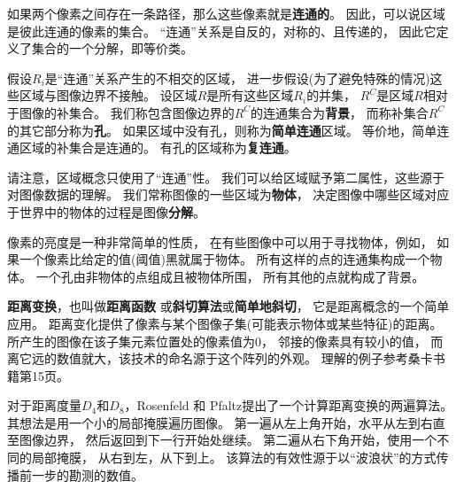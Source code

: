 如果两个像素之间存在一条路径，那么这些像素就是\textbf{\color{magenta}连通的}。
因此，可以说区域是彼此连通的像素的集合。%
“连通”关系是自反的，对称的、且传递的，%
因此它定义了集合的一个分解，即等价类。%

假设$R_{i}$是“连通”关系产生的不相交的区域，%
进一步假设(为了避免特殊的情况)这些区域与图像边界不接触。%
设区域$R$是所有这些区域$R_{i}$的并集，%
$R^{C}$是区域$R$相对于图像的补集合。%
我们称包含图像边界的$R^{C}$的连通集合为\textbf{\color{magenta}背景}，%
而称补集合$R^{C}$的其它部分称为\textbf{\color{magenta}孔}。%
如果区域中没有孔，则称为\textbf{\color{magenta}简单连通}区域。%
等价地，简单连通区域的补集合是连通的。%
有孔的区域称为\textbf{\color{magenta}复连通}。

请注意，区域概念只使用了“连通”性。%
我们可以给区域赋予第二属性，这些源于对图像数据的理解。%
我们常称图像的一些区域为\textbf{\color{magenta}物体}，%
决定图像中哪些区域对应于世界中的物体的过程是图像\textbf{\color{magenta}分解}。%

像素的亮度是一种非常简单的性质，%
在有些图像中可以用于寻找物体，例如，%
如果一个像素比给定的值(阈值)黑就属于物体。%
所有这样的点的连通集构成一个物体。%
一个孔由非物体的点组成且被物体所围，%
所有其他的点就构成了背景。

\textbf{\color{magenta}距离变换}，也叫做\textbf{\color{magenta}距离函数}
或\textbf{\color{magenta}斜切算法}或\textbf{\color{magenta}简单地斜切}，%
它是距离概念的一个简单应用。%
距离变化提供了像素与某个图像子集(可能表示物体或某些特征)的距离。%
所产生的图像在该子集元素位置处的像素值为0，%
邻接的像素具有较小的值，%
而离它远的数值就大，该技术的命名源于这个阵列的外观。%
理解的例子参考桑卡书籍第15页。

对于距离度量$D_{4}$和$D_{8}$，Rosenfeld 和 Pfaltz提出了一个计算距离变换的两遍算法。%
其想法是用一个小的局部掩膜遍历图像。%
第一遍从左上角开始，水平从左到右直至图像边界，%
然后返回到下一行开始处继续。%
第二遍从右下角开始，使用一个不同的局部掩膜，%
从右到左，从下到上。%
该算法的有效性源于以“波浪状”的方式传播前一步的勘测的数值。%

